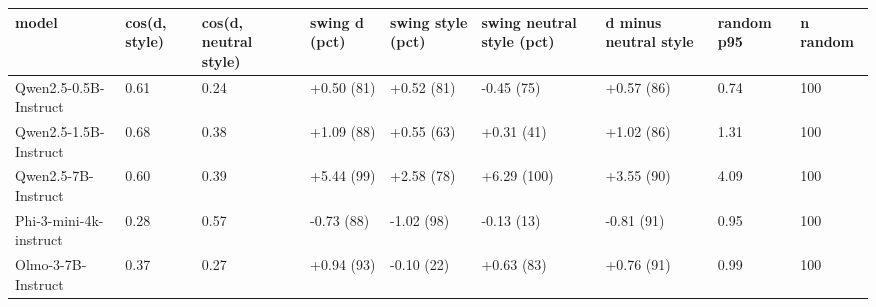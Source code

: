 \begin{tabular}{lllllllll}
\toprule
model & cos(d, style) & cos(d, neutral style) & swing d (pct) & swing style (pct) & swing neutral style (pct) & d minus neutral style & random p95 & n random \\
\midrule
Qwen2.5-0.5B-Instruct & 0.61 & 0.24 & +0.50 (81) & +0.52 (81) & -0.45 (75) & +0.57 (86) & 0.74 & 100 \\
Qwen2.5-1.5B-Instruct & 0.68 & 0.38 & +1.09 (88) & +0.55 (63) & +0.31 (41) & +1.02 (86) & 1.31 & 100 \\
Qwen2.5-7B-Instruct & 0.60 & 0.39 & +5.44 (99) & +2.58 (78) & +6.29 (100) & +3.55 (90) & 4.09 & 100 \\
Phi-3-mini-4k-instruct & 0.28 & 0.57 & -0.73 (88) & -1.02 (98) & -0.13 (13) & -0.81 (91) & 0.95 & 100 \\
Olmo-3-7B-Instruct & 0.37 & 0.27 & +0.94 (93) & -0.10 (22) & +0.63 (83) & +0.76 (91) & 0.99 & 100 \\
\bottomrule
\end{tabular}
